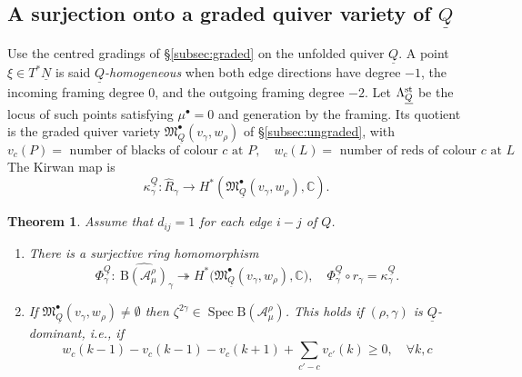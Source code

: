 \documentclass[11pt,reqno]{amsart}
\newtheorem{Theorem}{Theorem}[section]
\theoremstyle{definition}
\theoremstyle{remark}
\def\bbC{\mathbb C}
\def\dN{\underline N}
\def\dQ{\underline Q}
\def\B{\mathrm B}
\def\calA{\mathcal A}
\def\Spec{\operatorname{Spec}}
\def\M{\mathfrak M}
\begin{document}
\subsection{A surjection onto a graded quiver variety of $\dQ$}\label{subsec:ns-dQ}
Use the centred gradings of \S\ref{subsec:graded} on the unfolded quiver $\dQ$. A point $\xi\in T^*\dN$ is said
\emph{$\dQ$-homogeneous} when both edge directions have degree $-1$,
the incoming framing degree $0$, and the outgoing framing degree $-2$.
Let $\Lambda_{\dQ}^{\rm st}$ be the locus of such points satisfying
$\mu^\bullet=0$ and generation by the framing.
Its quotient is the graded quiver variety $\M^\bullet_{\dQ}(v_\gamma,w_\rho)$ of
\S\ref{subsec:ungraded}, with 
$$v_c(P)=\text{ number of blacks of colour $c$ at $P$}
,\quad
w_c(L)=\text{ number of reds of colour $c$ at $L$}$$ 
The Kirwan map is
\[
 \kappa_\gamma^{\dQ}:\widehat R_\gamma\longrightarrow
 H^*(\M^\bullet_{\dQ}(v_\gamma,w_\rho),\bbC).
\]



\begin{Theorem}\label{thm:ns-dQ}
Assume that $d_{ij}=1$ for each edge $i-j$ of $Q$. 
\begin{enumerate}[label=$\mathrm{(\alph*)}$,leftmargin=8mm]
\item There is a surjective ring homomorphism
\[
\Phi^{\dQ}_\gamma:\ \widehat{\B(\calA^\rho_\mu)}_\gamma\twoheadrightarrow H^*\big(\M^\bullet_{\dQ}(v_\gamma,w_\rho),\bbC\big),\quad
\Phi^{\dQ}_\gamma\circ r_\gamma=\kappa^{\dQ}_\gamma .
\]
\item
If $\M^\bullet_{\dQ}(v_\gamma,w_\rho)\neq\emptyset$ then $\zeta^{2\gamma}\in\Spec\B(\calA^\rho_\mu)$.
This holds if $(\rho,\gamma)$ is
{$\dQ$-dominant}, i.e., if 
$$w_c(k-1)-v_c(k-1)-v_c(k+1)+\sum_{c'-c}v_{c'}(k)\geqslant0,\quad\forall k,c$$ \end{enumerate}
\end{Theorem}
\end{document}
